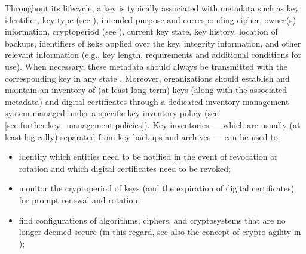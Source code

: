 Throughout its lifecycle, a key is typically associated with metadata such as key identifier, key type (see ), intended purpose and corresponding cipher, owner(s) information, cryptoperiod (see ), current key state, key history, location of backups, identifiers of \glspl{kek} applied over the key, integrity information, and other relevant information (e.g., key length, requirements and additional conditions for use). When necessary, these metadata should always be transmitted with the corresponding key in any state \cite{barker_profile_2015}. Moreover, organizations should establish and maintain an inventory of (at least long-term) keys (along with the associated metadata) and digital certificates through a dedicated inventory management system \cite{barker_recommendation_2020_p1} managed under a specific key-inventory policy (see \cref{sec:further:key_management:policies}). Key inventories --- which are usually (at least logically) separated from key backups and archives --- can be used to:

\begin{itemize}
	\item identify which entities need to be notified in the event of revocation or rotation and which digital certificates need to be revoked;
	\item monitor the cryptoperiod of keys (and the expiration of digital certificates) for prompt renewal and rotation;
	\item find configurations of algorithms, ciphers, and cryptosystems that are no longer deemed secure (in this regard, see also the concept of crypto-agility in );
\end{itemize}

